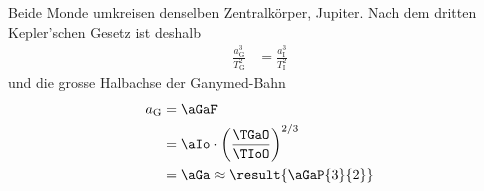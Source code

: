 Beide Monde umkreisen denselben Zentralkörper, Jupiter. Nach dem dritten Kepler'schen Gesetz ist deshalb
\begin{align}
 \frac{a_\text{G}^3}{T_\text{G}^2} &= \frac{a_\text{I}^3}{T_\text{I}^2}
\end{align}
und die grosse Halbachse der Ganymed-Bahn
\begin{align}
 a_\text{G} &= \aGaF \\
   &= \aIo\cdot\left(\frac{\TGaO}{\TIoO}\right)^{2/3} \\
   &= \aGa \approx \result{\aGaP{3}{2}}
\end{align}
